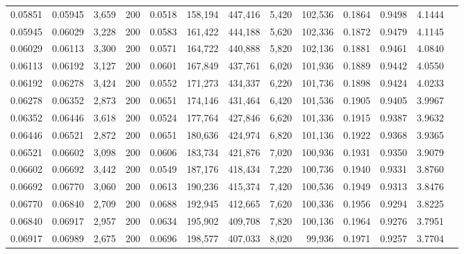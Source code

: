 \begin{tabular}{rrrrrrrrrrrrr}
0.05851 & 0.05945 &  3,659 & 200 &                                     0.0518 & 158,194 & 447,416 &   5,420 & 102,536 & 0.1864 & 0.9498 & 4.1444 \\
0.05945 & 0.06029 &  3,228 & 200 &                                     0.0583 & 161,422 & 444,188 &   5,620 & 102,336 & 0.1872 & 0.9479 & 4.1145 \\
0.06029 & 0.06113 &  3,300 & 200 &                                     0.0571 & 164,722 & 440,888 &   5,820 & 102,136 & 0.1881 & 0.9461 & 4.0840 \\
0.06113 & 0.06192 &  3,127 & 200 &                                     0.0601 & 167,849 & 437,761 &   6,020 & 101,936 & 0.1889 & 0.9442 & 4.0550 \\
0.06192 & 0.06278 &  3,424 & 200 &                                     0.0552 & 171,273 & 434,337 &   6,220 & 101,736 & 0.1898 & 0.9424 & 4.0233 \\
0.06278 & 0.06352 &  2,873 & 200 &                                     0.0651 & 174,146 & 431,464 &   6,420 & 101,536 & 0.1905 & 0.9405 & 3.9967 \\
0.06352 & 0.06446 &  3,618 & 200 &                                     0.0524 & 177,764 & 427,846 &   6,620 & 101,336 & 0.1915 & 0.9387 & 3.9632 \\
0.06446 & 0.06521 &  2,872 & 200 &                                     0.0651 & 180,636 & 424,974 &   6,820 & 101,136 & 0.1922 & 0.9368 & 3.9365 \\
0.06521 & 0.06602 &  3,098 & 200 &                                     0.0606 & 183,734 & 421,876 &   7,020 & 100,936 & 0.1931 & 0.9350 & 3.9079 \\
0.06602 & 0.06692 &  3,442 & 200 &                                     0.0549 & 187,176 & 418,434 &   7,220 & 100,736 & 0.1940 & 0.9331 & 3.8760 \\
0.06692 & 0.06770 &  3,060 & 200 &                                     0.0613 & 190,236 & 415,374 &   7,420 & 100,536 & 0.1949 & 0.9313 & 3.8476 \\
0.06770 & 0.06840 &  2,709 & 200 &                                     0.0688 & 192,945 & 412,665 &   7,620 & 100,336 & 0.1956 & 0.9294 & 3.8225 \\
0.06840 & 0.06917 &  2,957 & 200 &                                     0.0634 & 195,902 & 409,708 &   7,820 & 100,136 & 0.1964 & 0.9276 & 3.7951 \\
0.06917 & 0.06989 &  2,675 & 200 &                                     0.0696 & 198,577 & 407,033 &   8,020 &  99,936 & 0.1971 & 0.9257 & 3.7704 \\

\end{tabular}
